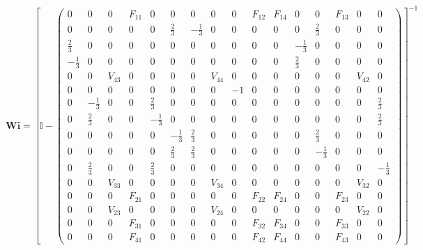 \[ \mathbf{Wi} =  \left[ \mathbb{I}  - \left(\begin{smallmatrix} 0 & 0
& 0 & F_{11} & 0 & 0 & 0 & 0 & 0 & F_{12} & F_{14} & 0 & 0 & F_{13} &
0 & 0 \\ 0 & 0 & 0 & 0 & 0 & \frac{2}{3} & -\frac{1}{3} & 0 & 0 & 0 &
0 & 0 & \frac{2}{3} & 0 & 0 & 0 \\ \frac{2}{3} & 0 & 0 & 0 & 0 & 0 & 0
& 0 & 0 & 0 & 0 & -\frac{1}{3} & 0 & 0 & 0 & 0 \\ -\frac{1}{3} & 0 & 0
& 0 & 0 & 0 & 0 & 0 & 0 & 0 & 0 & \frac{2}{3} & 0 & 0 & 0 & 0 \\ 0 & 0
& V_{43} & 0 & 0 & 0 & 0 & V_{44} & 0 & 0 & 0 & 0 & 0 & 0 & V_{42} & 0
\\ 0 & 0 & 0 & 0 & 0 & 0 & 0 & 0 & -1 & 0 & 0 & 0 & 0 & 0 & 0 & 0 \\ 0
& -\frac{1}{3} & 0 & 0 & \frac{2}{3} & 0 & 0 & 0 & 0 & 0 & 0 & 0 & 0 &
0 & 0 & \frac{2}{3} \\ 0 & \frac{2}{3} & 0 & 0 & -\frac{1}{3} & 0 & 0
& 0 & 0 & 0 & 0 & 0 & 0 & 0 & 0 & \frac{2}{3} \\ 0 & 0 & 0 & 0 & 0 &
-\frac{1}{3} & \frac{2}{3} & 0 & 0 & 0 & 0 & 0 & \frac{2}{3} & 0 & 0 &
0 \\ 0 & 0 & 0 & 0 & 0 & \frac{2}{3} & \frac{2}{3} & 0 & 0 & 0 & 0 & 0
& -\frac{1}{3} & 0 & 0 & 0 \\ 0 & \frac{2}{3} & 0 & 0 & \frac{2}{3} &
0 & 0 & 0 & 0 & 0 & 0 & 0 & 0 & 0 & 0 & -\frac{1}{3} \\ 0 & 0 & V_{33}
& 0 & 0 & 0 & 0 & V_{34} & 0 & 0 & 0 & 0 & 0 & 0 & V_{32} & 0 \\ 0 & 0
& 0 & F_{21} & 0 & 0 & 0 & 0 & 0 & F_{22} & F_{24} & 0 & 0 & F_{23} &
0 & 0 \\ 0 & 0 & V_{23} & 0 & 0 & 0 & 0 & V_{24} & 0 & 0 & 0 & 0 & 0 &
0 & V_{22} & 0 \\ 0 & 0 & 0 & F_{31} & 0 & 0 & 0 & 0 & 0 & F_{32} &
F_{34} & 0 & 0 & F_{33} & 0 & 0 \\ 0 & 0 & 0 & F_{41} & 0 & 0 & 0 & 0
& 0 & F_{42} & F_{44} & 0 & 0 & F_{43} & 0 & 0
\end{smallmatrix}\right) \right]^{-1}  \]
